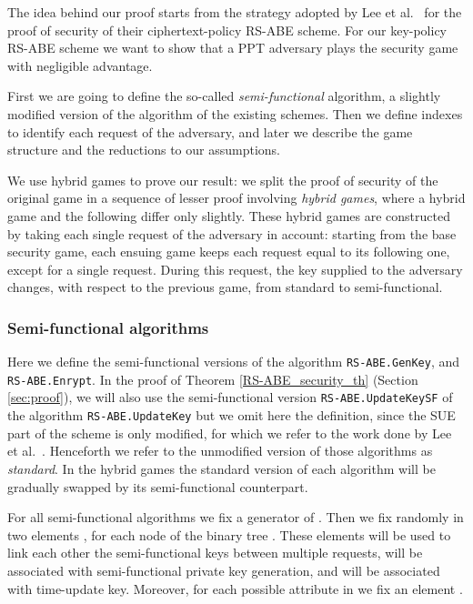 \documentclass[a4paper,10pt]{article}
\newcommand{\algorithm}[2]{\texttt{#1.#2}}
\begin{document}
The idea behind our proof starts from the strategy adopted by Lee et al.~\cite{lee2013RSABE} for the proof of security of their ciphertext-policy RS-ABE scheme. For our key-policy RS-ABE scheme we want to show that a PPT adversary  plays the security game with negligible advantage.
	
	First we are going to define the so-called \emph{semi-functional} algorithm, a slightly modified version of the algorithm of the existing schemes. Then we define indexes to identify each request of the adversary, and later we describe the game structure and the reductions to our assumptions.
	
	We use hybrid games to prove our result: we split the proof of security of the original game in a sequence of lesser proof involving \emph{hybrid games}, where a hybrid game and the following differ 	only slightly. These hybrid games are constructed by taking each single request of the adversary in account: starting from the base security game, each ensuing game keeps each request equal to its following one, except for a single request. During this request, the key supplied to the adversary changes, with respect to the previous game, from standard to semi-functional.
	


	\subsubsection{Semi-functional algorithms}
	\label{semifunctional.def}
	Here we define the semi-functional versions of the algorithm \algorithm{RS-ABE}{GenKey}, and \algorithm{RS-ABE}{Enrypt}. 
	In the proof of Theorem \ref{RS-ABE_security_th} (Section \ref{sec:proof}), we will also use the semi-functional version \algorithm{RS-ABE}{UpdateKeySF} of the algorithm \algorithm{RS-ABE}{UpdateKey} but we omit here the definition, since the SUE part of the scheme is only modified, for which we refer to the work done by Lee et al.~\cite{lee2013RSABE}.  
	Henceforth we refer to the unmodified version of those algorithms as \emph{standard}. In the hybrid games the standard version of each algorithm will be gradually swapped by its semi-functional counterpart.

	For all semi-functional algorithms we fix a generator  of . Then we fix randomly in  two elements ,  for each node  of the binary tree . These elements will be used to link each other the semi-functional keys between multiple requests,  will be associated with semi-functional private key generation, and  will be associated with time-update key.	
Moreover, for each possible attribute in  we fix an element .
\end{document}
